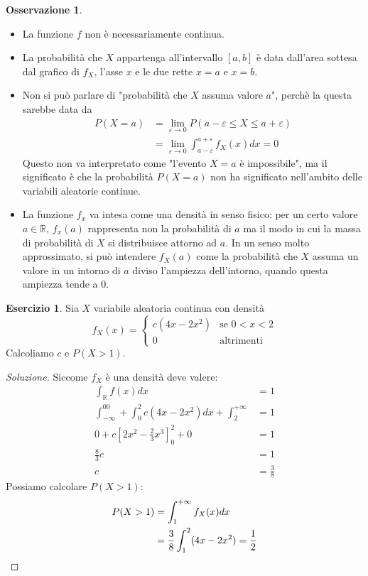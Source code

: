 \documentclass{article}
\theoremstyle{plain}
\theoremstyle{definition}
\newtheorem{osservazione}{Osservazione}[section]
\newtheorem{esercizio}{Esercizio}[section]
\theoremstyle{remark}
\newenvironment{soluzione}
	{\renewcommand\qedsymbol{$\mathwitch*$}\begin{proof}[Soluzione]}
	{\end{proof}}
\renewcommand{\qedsymbol}{$\mathrightghost$}
\begin{document}
\begin{osservazione}
	\begin{itemize}
		\item La funzione $f$ non è necessariamente continua.
		\item La probabilità che $X$ appartenga all'intervallo $[a,b]$ è data dall'area sottesa dal grafico di $f_X$, l'asse $x$ e le due rette $x=a$ e $x=b$.
		\item Non si può parlare di "probabilità che $X$ assuma valore $a$", perchè la questa sarebbe data da
		\begin{align*}
			P(X=a)&=\lim_{\varepsilon\to0}P(a-\varepsilon\leq X\leq a+\varepsilon)\\
			&=\lim_{\varepsilon\to0}\int_{a-\varepsilon}^{a+\varepsilon}f_X(x)dx=0
		\end{align*}
		Questo non va interpretato come "l'evento $X=a$ è impossibile", ma il significato è che la probabilità $P(X=a)$ non ha significato nell'ambito delle variabili aleatorie continue.
		\item La funzione $f_x$ va intesa come una densità in senso fisico: per un certo valore $a\in\mathds{R}$, $f_x(a)$ rappresenta non la probabilità di $a$ ma il modo in cui la massa di probabilità di $X$ si distribuisce attorno ad $a$. In un senso molto approssimato, si può intendere $f_X(a)$ come la probabilità che $X$ assuma un valore in un intorno di $a$ diviso l'ampiezza dell'intorno, quando questa ampiezza tende a $0$.
	\end{itemize}
\end{osservazione}
\begin{esercizio}
	Sia $X$ variabile aleatoria continua con densità
	\begin{equation*}
		f_X(x)=
		\begin{cases}
			c(4x-2x^2)&\text{se }0<x<2\\
			0&\text{altrimenti}
		\end{cases}
	\end{equation*}
	Calcoliamo $c$ e $P(X>1)$.
	\begin{soluzione}
		Siccome $f_X$ è una densità deve valere:
		\begin{align*}
			\int_\mathds{R}f(x)dx&=1\\
			\int_{-\infty}^00+\int_0^2c(4x-2x^2)dx+\int_2^{+\infty}&=1\\
			0+c\left[2x^2-\frac{2}{3}x^3\right]_0^2+0&=1\\
			\frac{8}{3}c&=1\\
			c&=\frac{3}{8}
		\end{align*}
		Possiamo calcolare $P(X>1)$:
		\begin{align*}
			P(X>1)&=\int_1^{+\infty}f_X(x)dx\\
			&=\frac{3}{8}\int_1^2(4x-2x^2)=\frac{1}{2}\qedhere
		\end{align*}
	\end{soluzione}
\end{esercizio}
\end{document}
